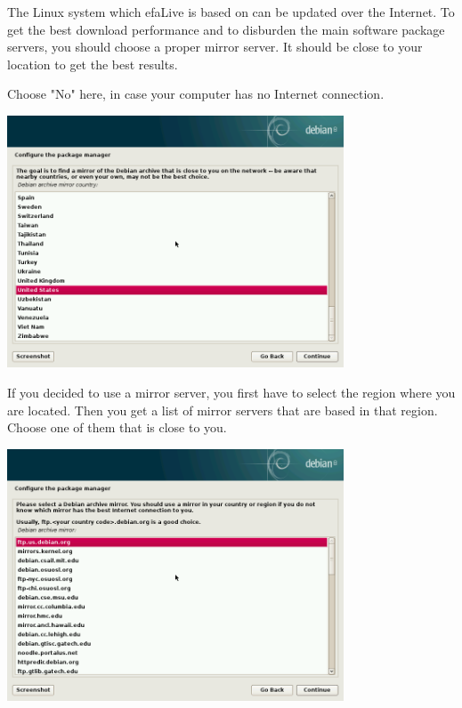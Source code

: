 \documentclass[a4paper,12pt,twoside]{article}
\begin{document}
The Linux system which efaLive is based on can be updated over the
Internet. To get the best download performance and to disburden the
main software package servers, you should choose a proper mirror
server. It should be close to your location to get the best results.

Choose "No" here, in case your computer has
no Internet connection.

\bigskip
\begin{minipage}{\linewidth}
    \centering
    \captionsetup{type=figure}
    \includegraphics[width=10cm]{screenshots/select_mirror_country.png}
    \label{fig:mirror_region}
\end{minipage}
\bigskip

If you decided to use a mirror server, you first have to select the
region where you are located. Then you get a list of mirror servers
that are based in that region. Choose one of them that is close to you.

\bigskip
\begin{minipage}{\linewidth}
    \centering
    \captionsetup{type=figure}
    \includegraphics[width=10cm]{screenshots/select_mirror.png}
    \label{fig:choose_mirror}
\end{minipage}
\bigskip
\end{document}
